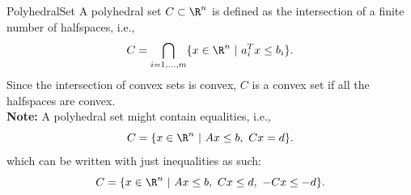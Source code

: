 \begin{ex}{PolyhedralSet}
    A polyhedral set $C \subset \R^n$ is defined as the intersection of a finite number of halfspaces, i\@.e\@.,
    \begin{equation*}
        C = \bigcap_{i= 1, \ldots, m} \{ x \in \R^n \ | \ a_i^T x \leq b_i \}.
    \end{equation*}
    Since the intersection of convex sets is convex, $C$ is a convex set if all the halfspaces are convex. \\

    \textbf{Note:} A polyhedral set might contain equalities, i\@.e\@., 
    \begin{equation*}
        C = \{ x \in \R^n \ | \ Ax \leq b, \ Cx = d \}.
    \end{equation*}
    which can be written with just inequalities as such:
    \begin{equation*}
        C = \{ x \in \R^n \ | \ Ax \leq b, \ Cx \leq d, \ -Cx \leq -d \}.
    \end{equation*}
    \vspace*{-0.5cm}
\end{ex}

